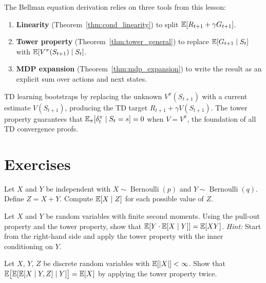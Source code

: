 \documentclass[11pt,a4paper]{article}
\begin{document}
\begin{rlconnection}[title={Connection to TD Learning}]
The Bellman equation derivation relies on three tools from this
lesson:
\begin{enumerate}[nosep]
  \item \textbf{Linearity} (Theorem~\ref{thm:cond_linearity})
    to split $\mathbb{E}[R_{t+1} + \gamma G_{t+1}]$.
  \item \textbf{Tower property}
    (Theorem~\ref{thm:tower_general}) to replace
    $\mathbb{E}[G_{t+1} \mid S_t]$ with
    $\mathbb{E}[V^\pi(S_{t+1}) \mid S_t]$.
  \item \textbf{MDP expansion}
    (Theorem~\ref{thm:mdp_expansion}) to write the result as
    an explicit sum over actions and next states.
\end{enumerate}
TD learning bootstraps by replacing the unknown $V^\pi(S_{t+1})$
with a current estimate $V(S_{t+1})$, producing the TD target
$R_{t+1} + \gamma V(S_{t+1})$.  The tower property guarantees
that $\mathbb{E}_\pi[\delta_t^\pi \mid S_t = s] = 0$ when $V = V^\pi$,
the foundation of all TD convergence proofs.
\end{rlconnection}


\section{Exercises}
\label{sec:exercises}

\begin{exercise}
\label{ex:cond_exp_compute}
Let $X$ and $Y$ be independent with
$X \sim \operatorname{Bernoulli}(p)$ and
$Y \sim \operatorname{Bernoulli}(q)$.
Define $Z = X + Y$.  Compute $\mathbb{E}[X \mid Z]$ for each possible
value of $Z$.
\end{exercise}

\begin{exercise}
\label{ex:pullout_application}
Let $X$ and $Y$ be random variables with finite second moments.
Using the pull-out property and the tower property, show that
$\mathbb{E}[Y \cdot \mathbb{E}[X \mid Y]] = \mathbb{E}[XY]$.
\textit{Hint:} Start from the right-hand side and apply the
tower property with the inner conditioning on $Y$.
\end{exercise}

\begin{exercise}
\label{ex:iterated_tower}
Let $X$, $Y$, $Z$ be discrete random variables with
$\mathbb{E}[|X|] < \infty$.  Show that
$\mathbb{E}\bigl[\mathbb{E}[\mathbb{E}[X \mid Y, Z] \mid Y] \bigr] = \mathbb{E}[X]$ by
applying the tower property twice.
\end{exercise}
\end{document}

